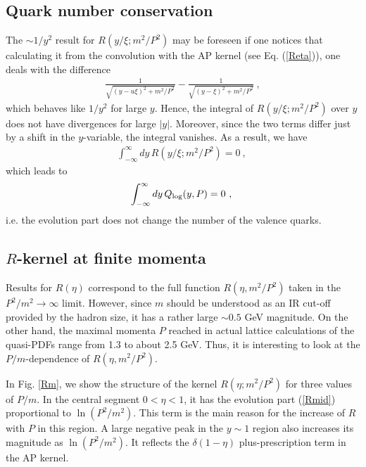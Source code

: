 \documentclass[final,5p,times,twocolumn]{elsarticle}
\begin{document}
\subsection{Quark  number conservation}

The $\sim 1/y^2$  result  for $R(y/\xi; m^2/P^2)$ may be foreseen if one notices that  calculating  it 
 from the convolution with the AP kernel
(see Eq. (\ref{Reta})), one deals with  the difference 
 \begin{align}
 \frac{1 }{\sqrt{(y -u\xi )^2+m^2/ P^2}} - \frac{1 }{\sqrt{(y -\xi )^2+m^2/ P^2}}
 \   , 
 \label{Ryzmp2}
\end{align} 
which  behaves like $1/y^2$ for large $y$. 
Hence, the   integral of  $ R(y/\xi;m^2/ P^2)$ over $y$ does not have divergences
for large $|y|$. 
Moreover, since the two  terms differ just by a shift in the \mbox{$y$-variable,}
the integral vanishes. As a result, we have
 \begin{align}
 \int_{-\infty}^\infty dy\,  R(y/\xi;m^2/ P^2)   = 0 \ , \
 \label{RKyx}
\end{align} 
which leads to 
 \begin{align}
 \int_{-\infty}^\infty dy\, Q_{\rm log}  (y, P)  = 0 \ , \
 \label{QKyx}
\end{align} 
i.e. the evolution  part does not change the  number of the  valence quarks.  





\subsection{$R$-kernel  at finite momenta} 

Results for $R(\eta)$ correspond to the full function
$R(\eta, m^2/P^2)$  taken in the $P^2/m^2  \to \infty $ limit. 
However, since $m$ should be understood as an 
IR cut-off provided by the hadron size, it has a rather large $\sim 0.5$ GeV magnitude.
On the  other hand, the  maximal momenta $P$  reached 
in actual lattice calculations of the quasi-PDFs 
 \cite{Lin:2014zya,Alexandrou:2016jqi}
range from 1.3 to about 2.5 GeV. Thus, it is interesting 
to look at the $P/m$-dependence of  $R(\eta, m^2/P^2)$. 

 In Fig.  \ref{Rm}, we show the structure of the kernel $R(\eta;m^2/P^2)$ 
  for three  values of $P/m$.  
In the central segment  $0<\eta<1$, it has the evolution part (\ref{Rmid})  proportional 
to $\ln (P^2/m^2)$. This term  is the main reason 
for  the increase of $R$ with $P$  in this region.  A large negative peak 
in the $y\sim 1$ region also increases its magnitude as $\ln (P^2/m^2)$.
It reflects the $\delta (1-\eta)$  plus-prescription term in the AP kernel. 
\end{document}
